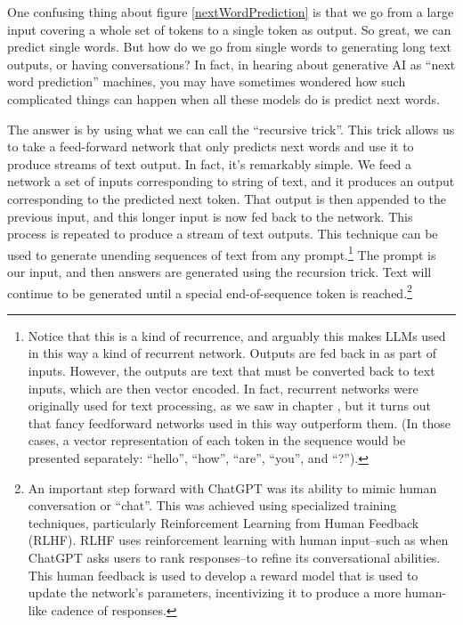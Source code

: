 One confusing thing about figure \ref{nextWordPrediction} is that we go from a
large input covering a whole set of tokens to a single token as output. So
great, we can predict single words. But how do we go from single words to
generating long text outputs, or having conversations? In fact, in hearing
about generative AI as ``next word prediction'' machines, you may have
sometimes wondered how such complicated things can happen when all these models
do is predict next words.

The answer is by using what we can call the ``recursive trick''. This trick
allows us to take a feed-forward network that only predicts next words and use
it to produce streams of text output. In fact, it's remarkably simple. We feed
a network a set of inputs corresponding to string of text, and it produces an
output corresponding to the predicted next token. That output is then appended
to the previous input, and this longer input is now fed back to the network.
This process is repeated to produce a stream of text outputs. This technique
can be used to generate unending sequences of text from any
prompt.\footnote{Notice that this is a kind of recurrence, and arguably this
makes LLMs used in this way a kind of recurrent network. Outputs are fed back
in as part of inputs. However, the outputs are text that must be converted back
to text inputs, which are then vector encoded. In fact, recurrent networks were
originally used for text processing, as we saw in chapter
, but it turns out that fancy feedforward
networks used in this way outperform them. (In those cases, a vector
representation of each token in the sequence would be presented separately:
``hello'', ``how'', ``are'', ``you'', and ``?'').} The prompt is our input, and
then answers are generated using the recursion trick. Text will continue to be
generated until a special end-of-sequence token is reached.\footnote{An
important step forward with ChatGPT was its ability to mimic human conversation
or ``chat''. This was achieved using specialized training techniques,
particularly Reinforcement Learning from Human Feedback (RLHF). RLHF uses
reinforcement learning with human input--such as when ChatGPT asks users to
rank responses--to refine its conversational abilities.  This human feedback is
used to develop a reward model that is used to update the network's parameters,
incentivizing it to produce a more human-like cadence of responses.} 


